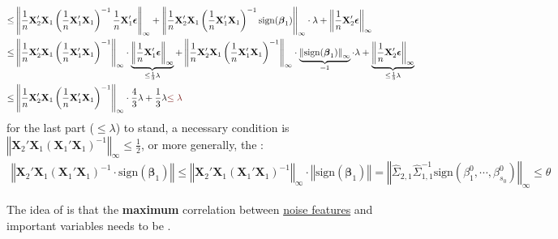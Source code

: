 \documentclass[twoside]{article}
\begin{document}
\begin{itemize}
\begin{align*}
        \leq & \left\Vert \frac{1}{n}\mathbf{X}_2' \mathbf{X}_1 \left( \frac{1}{n}\mathbf{X}_1' \mathbf{X}_1 \right)^{-1} \frac{1}{n}\mathbf{X}_1'\boldsymbol{\epsilon} \right\Vert _{\infty}  +  \left\Vert \frac{1}{n}\mathbf{X}_2' \mathbf{X}_1  \left( \frac{1}{n}\mathbf{X}_1' \mathbf{X}_1 \right)^{-1}{\mathrm{sign}({\boldsymbol{\beta}}_1)} \right\Vert _{\infty}\cdot \lambda + \left\Vert \frac{1}{n}\mathbf{X}_2'\boldsymbol{\epsilon} \right\Vert _{\infty} \\
        \leq & \left\Vert \frac{1}{n}\mathbf{X}_2' \mathbf{X}_1 \left( \frac{1}{n}\mathbf{X}_1' \mathbf{X}_1 \right)^{-1} \right\Vert _{\infty} \cdot \underbrace{\left\Vert \frac{1}{n}\mathbf{X}_1'\boldsymbol{\epsilon} \right\Vert _{\infty}}_{\leq \frac{1}{3}\lambda}  +  \left\Vert \frac{1}{n}\mathbf{X}_2' \mathbf{X}_1  \left( \frac{1}{n}\mathbf{X}_1' \mathbf{X}_1 \right)^{-1} \right\Vert _{\infty} \cdot \underbrace{\left\Vert {\mathrm{sign}({\boldsymbol{\beta}}_1)}\right\Vert _{\infty}}_{= 1} \cdot \lambda +  \underbrace{\left\Vert \frac{1}{n}\mathbf{X}_2'\boldsymbol{\epsilon} \right\Vert _{\infty}}_{\leq \frac{1}{3}\lambda}\\
        \leq & \left\Vert \frac{1}{n}\mathbf{X}_2' \mathbf{X}_1 \left( \frac{1}{n}\mathbf{X}_1' \mathbf{X}_1 \right)^{-1} \right\Vert _{\infty} \cdot \frac{4}{3}\lambda + \frac{1}{3}\lambda \textcolor{myred}{\leq \lambda}
    \end{align*}
    for the last part ($\leq \lambda$) to stand, a necessary condition is $\left\Vert \mathbf{X}_2' \mathbf{X}_1 \left( \mathbf{X}_1' \mathbf{X}_1 \right)^{-1} \right\Vert _{\infty} \leq \frac{1}{2}$, or more generally, the :
    \begin{align*}
        \left\Vert \mathbf{X}_2' \mathbf{X}_1 \left( \mathbf{X}_1' \mathbf{X}_1 \right)^{-1} \cdot \mathrm{sign}(\boldsymbol{\beta}_1) \right\Vert \leq \left\Vert \mathbf{X}_2' \mathbf{X}_1 \left( \mathbf{X}_1' \mathbf{X}_1 \right)^{-1} \right\Vert _{\infty}\cdot \left\Vert \mathrm{sign}(\boldsymbol{\beta}_1) \right\Vert = \left\Vert \hat{\Sigma}_{2,1}\hat{\Sigma}_{1,1}^{-1}\mathrm{sign}\left( \beta^0_1,\cdots,\beta^0_{s_0}\right) \right\Vert _{\infty} \leq\theta
    \end{align*}
\end{itemize}
The idea of  is that the \textbf{maximum} correlation between \underline{noise features} and important variables needs to be .
\end{document}
